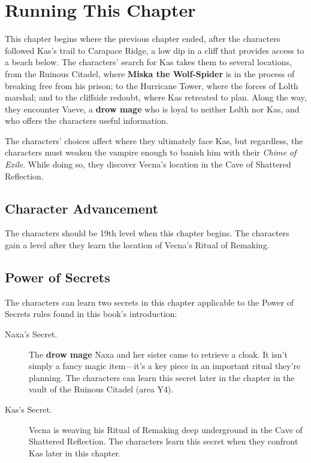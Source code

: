 \documentclass[10pt,a4paper,twoside,bg=print,twocolumn,openany,nodeprecatedcode]{dndbook}
\begin{document}
\section{Running This Chapter}
This chapter begins where the previous chapter ended, after the characters followed Kas's trail to Carapace Ridge, a low dip in a cliff that provides access to a beach below. The characters' search for Kas takes them to several locations, from the Ruinous Citadel, where \textbf{Miska the Wolf-Spider} is in the process of breaking free from his prison; to the Hurricane Tower, where the forces of Lolth marshal; and to the cliffside redoubt, where Kas retreated to plan. Along the way, they encounter Vaeve, a \textbf{drow mage} who is loyal to neither Lolth nor Kas, and who offers the characters useful information.

The characters' choices affect where they ultimately face Kas, but regardless, the characters must weaken the vampire enough to banish him with their \textit{Chime of Exile}. While doing so, they discover Vecna's location in the Cave of Shattered Reflection.

\subsection{Character Advancement}
The characters should be 19th level when this chapter begins. The characters gain a level after they learn the location of Vecna's Ritual of Remaking.

\subsection{Power of Secrets}
The characters can learn two secrets in this chapter applicable to the Power of Secrets rules found in this book's introduction:


\begin{description}
\item[Naxa's Secret.]
The \textbf{drow mage} Naxa and her sister came to retrieve a cloak. It isn't simply a fancy magic item—it's a key piece in an important ritual they're planning. The characters can learn this secret later in the chapter in the vault of the Ruinous Citadel (area Y4).
\item[Kas's Secret.]
Vecna is weaving his Ritual of Remaking deep underground in the Cave of Shattered Reflection. The characters learn this secret when they confront Kas later in this chapter.
\end{description}
\end{document}
